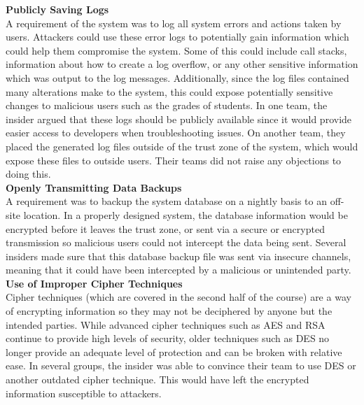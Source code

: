 \documentclass[conference]{IEEEtran}
\begin{document}
\textbf{Publicly Saving Logs}\\
A requirement of the system was to log all system errors and actions taken by users. Attackers could use these error logs to potentially gain information which could help them compromise the system. Some of this could include call stacks, information about how to create a log overflow, or any other sensitive information which was output to the log messages. Additionally, since the log files contained many alterations make to the system, this could expose potentially sensitive changes to malicious users such as the grades of students. In one team, the insider argued that these logs should be publicly available since it would provide easier access to developers when troubleshooting issues. On another team, they placed the generated log files outside of the trust zone of the system, which would expose these files to outside users. Their teams did not raise any objections to doing this. \\


\textbf{Openly Transmitting Data Backups}\\
A requirement was to backup the system database on a nightly basis to an off-site location. In a properly designed system, the database information would be encrypted before it leaves the trust zone, or sent via a secure or encrypted transmission so malicious users could not intercept the data being sent. Several insiders made sure that this database backup file was sent via insecure channels, meaning that it could have been intercepted by a malicious or unintended party. \\


\textbf{Use of Improper Cipher Techniques}\\
Cipher techniques (which are covered in the second half of the course) are a way of encrypting information so they may not be deciphered by anyone but the intended parties. While advanced cipher techniques such as AES and RSA continue to provide high levels of security, older techniques such as DES no longer provide an adequate level of protection and can be broken with relative ease. In several groups, the insider was able to convince their team to use DES or another outdated cipher technique. This would have left the encrypted information susceptible to attackers. \\
\end{document}
